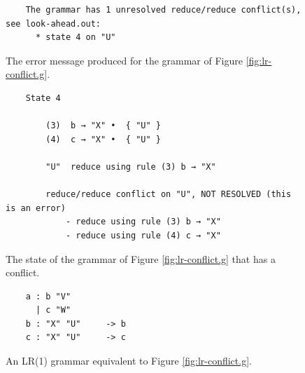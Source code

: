 \begin{figure}[!ht]
\centering
\begin{verbatim}
    The grammar has 1 unresolved reduce/reduce conflict(s), see look-ahead.out:
      * state 4 on "U"
\end{verbatim}
\vspace*{-0.3cm}
\caption{The error message produced for the grammar of Figure \ref{fig:lr-conflict.g}.}
\label{fig:Look-Ahead.error}
\end{figure}

\begin{figure}[!ht]
\centering
\begin{verbatim}
    State 4

        (3)  b → "X" •  { "U" }
        (4)  c → "X" •  { "U" }

        "U"  reduce using rule (3) b → "X"

        reduce/reduce conflict on "U", NOT RESOLVED (this is an error)
            - reduce using rule (3) b → "X"
            - reduce using rule (4) c → "X"
\end{verbatim}
\vspace*{-0.3cm}
\caption{The state of the grammar of Figure \ref{fig:lr-conflict.g} that has a conflict.}
\label{fig:Look-Ahead.state4}
\end{figure}

\begin{figure}[!ht]
\centering
\begin{verbatim}
    a : b "V"
      | c "W"
    b : "X" "U"     -> b
    c : "X" "U"     -> c
\end{verbatim}
\vspace*{-0.3cm}
\caption{An LR(1) grammar equivalent to Figure \ref{fig:lr-conflict.g}.}
\label{fig:lr-conflict-resolved.g}
\end{figure}


